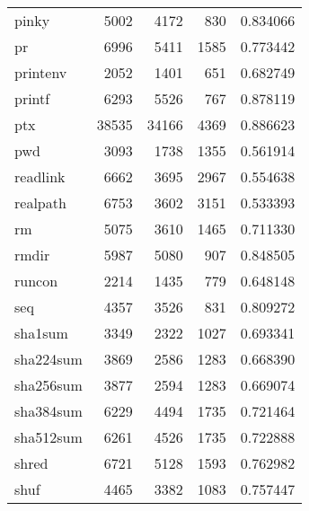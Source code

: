 \begin{tabular}{lrrrr}
pinky     &                     5002 &         4172 &           830 &                 0.834066 \\
pr        &                     6996 &         5411 &          1585 &                 0.773442 \\
printenv  &                     2052 &         1401 &           651 &                 0.682749 \\
printf    &                     6293 &         5526 &           767 &                 0.878119 \\
ptx       &                    38535 &        34166 &          4369 &                 0.886623 \\
pwd       &                     3093 &         1738 &          1355 &                 0.561914 \\
readlink  &                     6662 &         3695 &          2967 &                 0.554638 \\
realpath  &                     6753 &         3602 &          3151 &                 0.533393 \\
rm        &                     5075 &         3610 &          1465 &                 0.711330 \\
rmdir     &                     5987 &         5080 &           907 &                 0.848505 \\
runcon    &                     2214 &         1435 &           779 &                 0.648148 \\
seq       &                     4357 &         3526 &           831 &                 0.809272 \\
sha1sum   &                     3349 &         2322 &          1027 &                 0.693341 \\
sha224sum &                     3869 &         2586 &          1283 &                 0.668390 \\
sha256sum &                     3877 &         2594 &          1283 &                 0.669074 \\
sha384sum &                     6229 &         4494 &          1735 &                 0.721464 \\
sha512sum &                     6261 &         4526 &          1735 &                 0.722888 \\
shred     &                     6721 &         5128 &          1593 &                 0.762982 \\
shuf      &                     4465 &         3382 &          1083 &                 0.757447 \\

\end{tabular}
